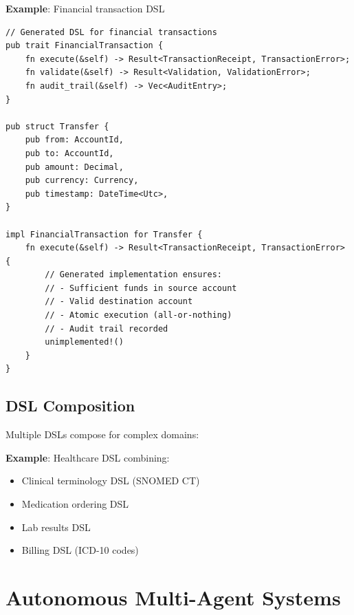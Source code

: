 \textbf{Example}: Financial transaction DSL

\begin{verbatim}
// Generated DSL for financial transactions
pub trait FinancialTransaction {
    fn execute(&self) -> Result<TransactionReceipt, TransactionError>;
    fn validate(&self) -> Result<Validation, ValidationError>;
    fn audit_trail(&self) -> Vec<AuditEntry>;
}

pub struct Transfer {
    pub from: AccountId,
    pub to: AccountId,
    pub amount: Decimal,
    pub currency: Currency,
    pub timestamp: DateTime<Utc>,
}

impl FinancialTransaction for Transfer {
    fn execute(&self) -> Result<TransactionReceipt, TransactionError> {
        // Generated implementation ensures:
        // - Sufficient funds in source account
        // - Valid destination account
        // - Atomic execution (all-or-nothing)
        // - Audit trail recorded
        unimplemented!()
    }
}
\end{verbatim}

\subsection{DSL Composition}

Multiple DSLs compose for complex domains:

\begin{definition}[DSL Product]}
    For DSLs $D_1, D_2, \ldots, D_n$, the product DSL $D = D_1 \times D_2 \times \cdots \times D_n$ combines their syntax and semantics:
    \begin{equation}
        \text{Lang}(D) = \bigcup_{i=1}^{n} \text{Lang}(D_i)
    \end{equation}
    \begin{equation}
        \text{Sem}(D) = \bigotimes_{i=1}^{n} \text{Sem}(D_i)
    \end{equation}
\end{definition}

\textbf{Example}: Healthcare DSL combining:
\begin{itemize}
    \item Clinical terminology DSL (SNOMED CT)
    \item Medication ordering DSL
    \item Lab results DSL
    \item Billing DSL (ICD-10 codes)
\end{itemize}

\section{Autonomous Multi-Agent Systems}

